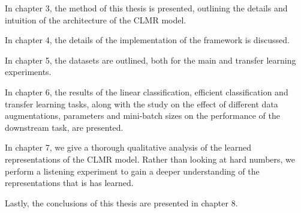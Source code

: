 In chapter 3, the method of this thesis is presented, outlining the details and intuition of the architecture of the CLMR model.

In chapter 4, the details of the implementation of the framework is discussed.

In chapter 5, the datasets are outlined, both for the main and transfer learning experiments.

In chapter 6, the results of the linear classification, efficient classification and transfer learning tasks, along with the study on the effect of different data augmentations, parameters and mini-batch sizes on the performance of the downstream task, are presented.

In chapter 7, we give a thorough qualitative analysis of the learned representations of the CLMR model. Rather than looking at hard numbers, we perform a listening experiment to gain a deeper understanding of the representations that is has learned.

Lastly, the conclusions of this thesis are presented in chapter 8.

